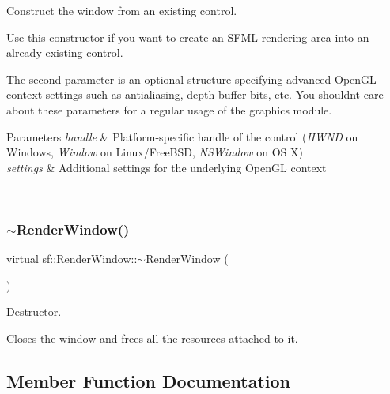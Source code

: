 Construct the window from an existing control. 

Use this constructor if you want to create an S\+F\+ML rendering area into an already existing control.

The second parameter is an optional structure specifying advanced Open\+GL context settings such as antialiasing, depth-\/buffer bits, etc. You shouldn\textquotesingle{}t care about these parameters for a regular usage of the graphics module.


\begin{DoxyParams}{Parameters}
{\em handle} & Platform-\/specific handle of the control ({\itshape H\+W\+ND} on Windows, {\itshape Window} on Linux/\+Free\+B\+SD, {\itshape N\+S\+Window} on OS X) \\
\hline
{\em settings} & Additional settings for the underlying Open\+GL context \begin{DoxyVerb}\end{DoxyVerb}
 \\
\hline
\end{DoxyParams}
\mbox{\label{classsf_1_1_render_window_a3407e36bfc1752d723140438a825365c}} 
\subsubsection{\texorpdfstring{$\sim$RenderWindow()}{~RenderWindow()}}
{\footnotesize\ttfamily virtual sf\+::\+Render\+Window\+::$\sim$\+Render\+Window (\begin{DoxyParamCaption}{ }\end{DoxyParamCaption})\hspace{0.3cm}{\ttfamily [virtual]}}



Destructor. 

Closes the window and frees all the resources attached to it. \begin{DoxyVerb}\end{DoxyVerb}
 

\subsection{Member Function Documentation}
\mbox{\label{classsf_1_1_render_window_a370137abe81f6b7d62b600ceeccd54d3}} 
